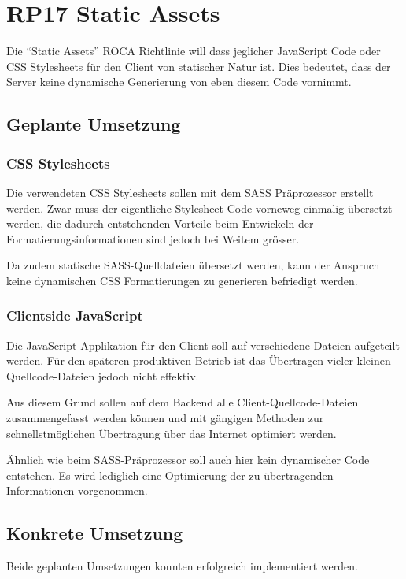 \section{RP17 Static Assets}
\label{sec:principle-rp17-static-assets}

Die ``Static Assets'' ROCA Richtlinie will dass jeglicher JavaScript Code oder CSS Stylesheets für den Client von statischer Natur ist. Dies bedeutet, dass der Server keine dynamische Generierung von eben diesem Code vornimmt.

\subsection*{Geplante Umsetzung}
\subsubsection*{CSS Stylesheets}
Die verwendeten CSS Stylesheets sollen mit dem SASS Präprozessor \cite{SASS} erstellt werden. Zwar muss der eigentliche Stylesheet Code vorneweg einmalig übersetzt werden, die dadurch entstehenden Vorteile beim Entwickeln der Formatierungsinformationen sind jedoch bei Weitem grösser.

Da zudem statische SASS-Quelldateien übersetzt werden, kann der Anspruch keine dynamischen CSS Formatierungen zu generieren befriedigt werden.

\subsubsection*{Clientside JavaScript}
Die JavaScript Applikation für den Client soll auf verschiedene Dateien aufgeteilt werden. Für den späteren produktiven Betrieb ist das Übertragen vieler kleinen Quellcode-Dateien jedoch nicht effektiv.

Aus diesem Grund sollen auf dem Backend alle Client-Quellcode-Dateien zusammengefasst werden können und mit gängigen Methoden zur schnellstmöglichen Übertragung über das Internet optimiert werden.

Ähnlich wie beim SASS-Präprozessor soll auch hier kein dynamischer Code entstehen. Es wird lediglich eine Optimierung der zu übertragenden Informationen vorgenommen.


\subsection*{Konkrete Umsetzung}
Beide geplanten Umsetzungen konnten erfolgreich implementiert werden.

